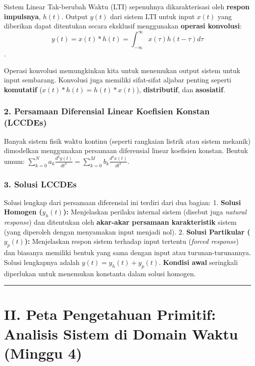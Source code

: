 \documentclass[
  letterpaper,
  DIV=11,
  numbers=noendperiod]{scrreprt}
\begin{document}
Sistem Linear Tak-berubah Waktu (LTI) sepenuhnya dikarakterisasi oleh
\textbf{respon impulsnya}, \(h(t)\). Output \(y(t)\) dari sistem LTI
untuk input \(x(t)\) yang diberikan dapat ditentukan secara eksklusif
menggunakan \textbf{operasi konvolusi}:
\[y(t) = x(t) * h(t) = \int_{-\infty}^{\infty} x(\tau)h(t-\tau)d\tau\].

Operasi konvolusi memungkinkan kita untuk menemukan output sistem untuk
input sembarang. Konvolusi juga memiliki sifat-sifat aljabar penting
seperti \textbf{komutatif} (\(x(t) * h(t) = h(t) * x(t)\)),
\textbf{distributif}, dan \textbf{asosiatif}.

\subsubsection{2. Persamaan Diferensial Linear Koefisien Konstan
(LCCDEs)}\label{persamaan-diferensial-linear-koefisien-konstan-lccdes-1}

Banyak sistem fisik waktu kontinu (seperti rangkaian listrik atau sistem
mekanik) dimodelkan menggunakan persamaan diferensial linear koefisien
konstan. Bentuk umum:
\(\sum_{k=0}^{N} a_k \frac{d^k y(t)}{dt^k} = \sum_{k=0}^{M} b_k \frac{d^k x(t)}{dt^k}\).

\subsubsection{3. Solusi LCCDEs}\label{solusi-lccdes}

Solusi lengkap dari persamaan diferensial ini terdiri dari dua bagian:
1. \textbf{Solusi Homogen (\(y_h(t)\)):} Menjelaskan perilaku internal
sistem (disebut juga \emph{natural response}) dan ditentukan oleh
\textbf{akar-akar persamaan karakteristik} sistem (yang diperoleh dengan
menyamakan input menjadi nol). 2. \textbf{Solusi Partikular
(\(y_p(t)\)):} Menjelaskan respon sistem terhadap input tertentu
(\emph{forced response}) dan biasanya memiliki bentuk yang sama dengan
input atau turunan-turunannya. Solusi lengkapnya adalah
\(y(t) = y_h(t) + y_p(t)\). \textbf{Kondisi awal} seringkali diperlukan
untuk menemukan konstanta dalam solusi homogen.

\begin{center}\rule{0.5\linewidth}{0.5pt}\end{center}

\section{II. Peta Pengetahuan Primitif: Analisis Sistem di Domain Waktu
(Minggu
4)}\label{ii.-peta-pengetahuan-primitif-analisis-sistem-di-domain-waktu-minggu-4}
\end{document}
